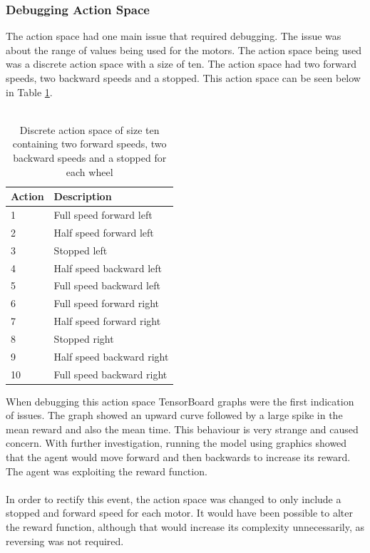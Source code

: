 \documentclass[a4paper,12pt]{article}
\begin{document}
\subsubsection{Debugging Action Space}
The action space had one main issue that required debugging. The issue was about the range of values being used for the motors. The action space being used was a discrete action space with a size of ten. The action space had two forward speeds, two backward speeds and a stopped. This action space can be seen below in Table \ref{tab:Discrete action space of size ten}.
\\\\
\begin{table}[H]
\centering
\caption{Discrete action space of size ten containing two forward speeds, two backward speeds and a stopped for each wheel}
\label{tab:Discrete action space of size ten}
\begin{tabular}{|ll|}
\hline
\textbf{Action} & \textbf{Description}\\ \hline
1 & Full speed forward left \\ 
2 & Half speed forward left \\ 
3 & Stopped left \\ 
4 & Half speed backward left \\ 
5 & Full speed backward left \\ 
6 & Full speed forward right \\ 
7 & Half speed forward right \\ 
8 & Stopped right \\ 
9 & Half speed backward right \\ 
10 & Full speed backward right \\ \hline
\end{tabular}
\end{table}
\noindent
When debugging this action space TensorBoard graphs were the first indication of issues. The graph showed an upward curve followed by a large spike in the mean reward and also the mean time. This behaviour is very strange and caused concern. With further investigation, running the model using graphics showed that the agent would move forward and then backwards to increase its reward. The agent was exploiting the reward function. 
\\\\
In order to rectify this event, the action space was changed to only include a stopped and forward speed for each motor. It would have been possible to alter the reward function, although that would increase its complexity unnecessarily, as reversing was not required. 
\end{document}
